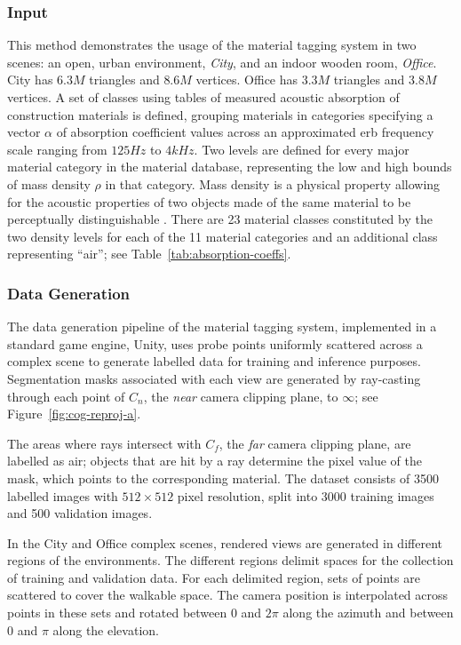 \subsubsection{Input}
This method demonstrates the usage of the material tagging system in two scenes: an open, urban environment, \emph{City}, and an indoor wooden room, \emph{Office}. City has $6.3M$ triangles and $8.6M$ vertices. Office has $3.3M$ triangles and $3.8M$ vertices. A set of classes using tables of measured acoustic absorption of construction materials is defined, grouping materials in categories specifying a vector $\alpha$ of absorption coefficient values across an approximated \acrfull{erb} frequency scale ranging from $125Hz$ to $4kHz$. Two levels are defined for every major material category in the material database, representing the low and high bounds of mass density $\rho$ in that category. Mass density is a physical property allowing for the acoustic properties of two objects made of the same material to be perceptually distinguishable \citep{giordano2006material}. There are 23 material classes constituted by the two density levels for each of the 11 material categories and an additional class representing ``air''; see Table~\ref{tab:absorption-coeffs}.

\subsubsection{Data Generation}
The data generation pipeline of the material tagging system, implemented in a standard game engine, Unity, uses probe points uniformly scattered across a complex scene to generate labelled data for training and inference purposes. Segmentation masks associated with each view are generated by ray-casting through each point of $C_n$, the \emph{near} camera clipping plane, to $\infty$; see Figure~\ref{fig:cog-reproj-a}.\par
The areas where rays intersect with $C_f$, the \emph{far} camera clipping plane, are labelled as air; objects that are hit by a ray determine the pixel value of the mask, which points to the corresponding material. The dataset consists of 3500 labelled images with $512\times512$ pixel resolution, split into 3000 training images and 500 validation images.\par
In the City and Office complex scenes, rendered views are generated in different regions of the environments. The different regions delimit spaces for the collection of training and validation data. For each delimited region, sets of points are scattered to cover the walkable space. The camera position is interpolated across points in these sets and rotated between 0 and $2\pi$ along the azimuth and between 0 and $\pi$ along the elevation.\par

